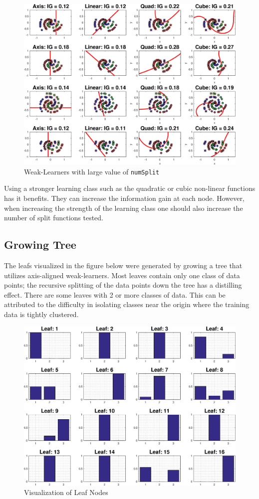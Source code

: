 \documentclass[a4paper,pra,twocolumn,10pt,aps,longbibliography,nobalancelastpage]{article}
\begin{document}
\begin{figure}[H]
	\centering
    \includegraphics[width=0.60\columnwidth]{split_function_visualitions_5}
    \caption{Weak-Learners with large value of \texttt{numSplit}}
    \label{fig:learners_3}
\end{figure}

Using a stronger learning class such as the quadratic or cubic non-linear functions has it benefits. They can increase the information gain at each node. However, when increasing the strength of the learning class one should also increase the number of split functions tested.

\subsection{Growing Tree}
The leafs visualized in the figure below were generated by growing a tree that utilizes axis-aligned weak-learners. Most leaves contain only one class of data points; the recursive splitting of the data points down the tree has a distilling effect. There are some leaves with 2 or more classes of data. This can be attributed to the difficulty in isolating classes near the origin where the training data is tightly clustered.

\begin{figure}[H]
	\centering
    \includegraphics[width=0.60\columnwidth]{leaf_node_distributions_1}
    \caption{Visualization of Leaf Nodes}
    \label{fig:leaf_nodes}
\end{figure}
\end{document}
